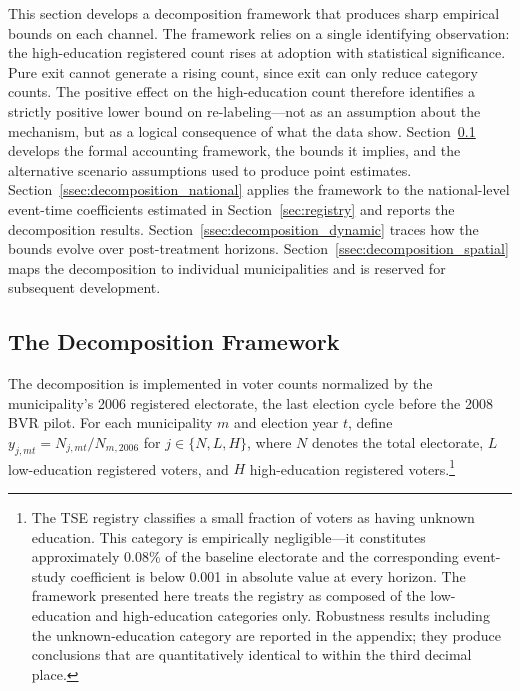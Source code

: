 This section develops a decomposition framework that produces sharp empirical bounds on each channel. The framework relies on a single identifying observation: the high-education registered count rises at adoption with statistical significance. Pure exit cannot generate a rising count, since exit can only reduce category counts. The positive effect on the high-education count therefore identifies a strictly positive lower bound on re-labeling---not as an assumption about the mechanism, but as a logical consequence of what the data show. Section~\ref{ssec:decomposition_math} develops the formal accounting framework, the bounds it implies, and the alternative scenario assumptions used to produce point estimates. Section~\ref{ssec:decomposition_national} applies the framework to the national-level event-time coefficients estimated in Section~\ref{sec:registry} and reports the decomposition results. Section~\ref{ssec:decomposition_dynamic} traces how the bounds evolve over post-treatment horizons. Section~\ref{ssec:decomposition_spatial} maps the decomposition to individual municipalities and is reserved for subsequent development.

\subsection{The Decomposition Framework}
\label{ssec:decomposition_math}

The decomposition is implemented in voter counts normalized by the municipality's 2006 registered electorate, the last election cycle before the 2008 BVR pilot. For each municipality $m$ and election year $t$, define $y_{j,mt} = N_{j,mt} / N_{m,2006}$ for $j \in \{N, L, H\}$, where $N$ denotes the total electorate, $L$ low-education registered voters, and $H$ high-education registered voters.\footnote{The TSE registry classifies a small fraction of voters as having unknown education. This category is empirically negligible---it constitutes approximately 0.08\% of the baseline electorate and the corresponding event-study coefficient is below 0.001 in absolute value at every horizon. The framework presented here treats the registry as composed of the low-education and high-education categories only. Robustness results including the unknown-education category are reported in the appendix; they produce conclusions that are quantitatively identical to within the third decimal place.}

